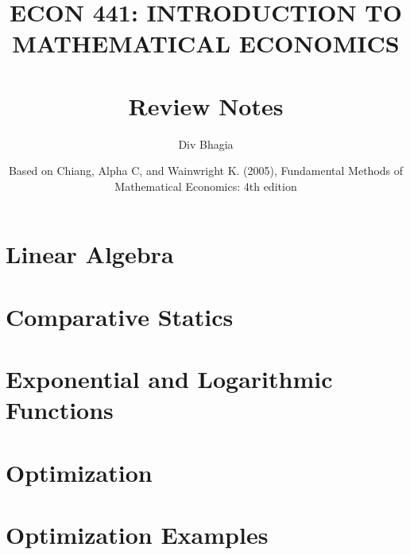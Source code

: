 \documentclass{./../Latex/allnotes}
\numberwithin{section}{chapter}
\numberwithin{subsection}{section}
\begin{document}
\title{\uppercase{ Econ 441: Introduction to Mathematical Economics} \\~\\ Review Notes}
\author{Div Bhagia}
\date{Based on Chiang, Alpha C, and Wainwright K. (2005), Fundamental Methods of Mathematical Economics: 4th edition}

\begin{titlepage}
  \setcounter{tocdepth}{1}
    \maketitle
    \tableofcontents    
\end{titlepage}

\chapter{Linear Algebra}

\rhead{\chaptername}

\chapter{Comparative Statics}


\chapter{Exponential and Logarithmic Functions}


\chapter{Optimization}


\chapter{Optimization Examples}

\end{document}
